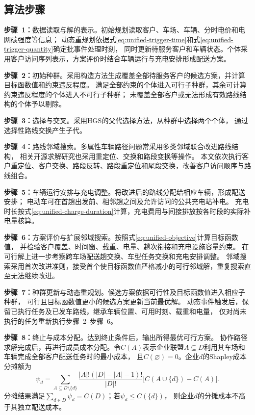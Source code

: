 \documentclass{setp-new}
\begin{document}
\subsection{算法步骤}

\textbf{步骤~1：}数据读取与解的表示。初始规划读取客户、车场、车辆、分时电价和电网碳强度等信息；
动态重规划依据式\eqref{eq:unified-trigger-time}和式\eqref{eq:unified-trigger-quantity}确定批事件处理时刻，
同时更新待服务客户和车辆状态。个体采用客户访问序列表示，方案评价时结合车辆运行与充电安排形成配送方案。

\textbf{步骤~2：}初始种群。采用构造方法生成覆盖全部待服务客户的候选方案，并计算目标函数值和约束违反程度。
满足全部约束的个体进入可行子种群，其余可计算约束违反程度的个体进入不可行子种群；
未覆盖全部客户或无法形成有效路线结构的个体予以剔除。

\textbf{步骤~3：}选择与交叉。采用HGS的父代选择方法，从种群中选择两个个体，
通过选择性路线交换产生子代\cite{ref:76}。

\textbf{步骤~4：}路线邻域搜索。多属性车辆路径问题常采用多类邻域联合改进路线结构\cite{ref:77}，
相关开源求解研究也采用重定位、交换和路段变换等操作\cite{ref:64}。
本文依次执行客户重定位、客户交换、路段反转、路段重定位和尾段交换，改善客户访问顺序与路线组合。

\textbf{步骤~5：}车辆运行安排与充电调整。将改进后的路线分配给相应车辆，形成配送安排；
电动车可在首趟出发前、相邻趟之间及允许访问的公共充电站补电。
充电时长按式\eqref{eq:unified-charge-duration}计算，充电费用与间接排放按各时段的实际补电量核算。

\textbf{步骤~6：}方案评价与扩展邻域搜索。按照式\eqref{eq:unified-objective}计算目标函数值，
并检验客户覆盖、时间窗、载重、电量、趟次衔接和充电设施容量约束。
在可行解上进一步考察跨车场配送趟交换、车型任务交换和充电安排调整。
邻域搜索采用首次改进准则，接受首个使目标函数值严格减小的可行邻域解，重复搜索直至无法继续改进。

\textbf{步骤~7：}种群更新与动态重规划。候选方案依据可行性及目标函数值进入相应子种群，
可行且目标函数值更小的候选方案更新当前最优解。
动态事件触发后，保留已执行任务及已发车路线，继承车辆位置、可用时刻、载重和电量，
仅对尚未执行的任务重新执行步骤~2--步骤~6。

\textbf{步骤~8：}终止与成本分配。达到终止条件后，输出所得最优可行方案。
协作路径求解完成后，再进行成员成本分配。令$C(A)$表示企业联盟$A\subseteq D$利用其车场和车辆完成全部客户配送任务时的最小成本，
且$C(\varnothing)=0$。企业$d$的Shapley成本分摊额为\cite{ref:91}
\begin{equation}
\psi_d=\sum_{A\subseteq D\setminus\{d\}}
\frac{|A|!(|D|-|A|-1)!}{|D|!}
\bigl[C(A\cup\{d\})-C(A)\bigr].
\label{eq:shapley-cost}
\end{equation}
分摊结果满足$\sum_{d\in D}\psi_d=C(D)$；若$\psi_d\le C(\{d\})$，
则企业$d$的分摊成本不高于其独立配送成本。
\end{document}
